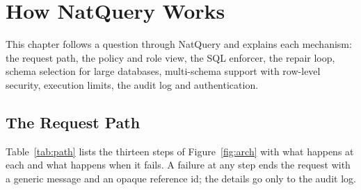 \chapter{How NatQuery Works}
\label{ch:how}

This chapter follows a question through NatQuery and explains each mechanism: the request path, the
policy and role view, the SQL enforcer, the repair loop, schema selection for large databases,
multi-schema support with row-level security, execution limits, the audit log and authentication.

\section{The Request Path}

Table~\ref{tab:path} lists the thirteen steps of Figure~\ref{fig:arch} with what happens at each and
what happens when it fails. A failure at any step ends the request with a generic message and an opaque
reference id; the details go only to the audit log.

